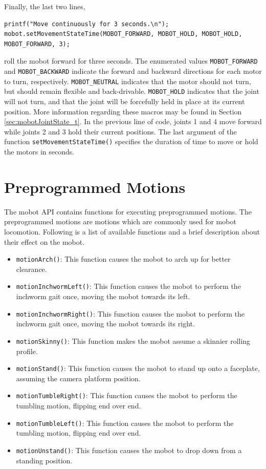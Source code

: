 \documentclass{article}
\begin{document}
Finally, the last two lines,
\begin{verbatim}
printf("Move continuously for 3 seconds.\n");
mobot.setMovementStateTime(MOBOT_FORWARD, MOBOT_HOLD, MOBOT_HOLD, MOBOT_FORWARD, 3);
\end{verbatim}
roll the mobot forward for three seconds.
The enumerated values \texttt{MOBOT\_FORWARD} and \texttt{MOBOT\_BACKWARD}
indicate the forward and backward directions for each motor to turn, respectively. 
\texttt{MOBOT\_NEUTRAL} indicates that the motor should not turn, but
should remain flexible and back-drivable. \texttt{MOBOT\_HOLD}
indicates that the joint will not turn, and that the joint will be 
forcefully held in place at its current position. More information regarding these
macros may be found in Section \ref{sec:mobotJointState_t}. In the previous
line of code, joints 1 and 4 
move forward while joints 2 and 3 hold their current positions. The
last argument  of the function \texttt{setMovementStateTime()} specifies the
duration of time to move or hold the motors in seconds.


\section{\label{sec:preprogrammed_motions}Preprogrammed Motions}
The mobot API contains functions for executing preprogrammed motions. The 
preprogrammed motions are motions which are commonly used for mobot locomotion.
Following is a list of available functions and a brief description about
their effect on the mobot.
\begin{itemize}
\item \texttt{motionArch()}: This function causes the mobot to arch up for better 
clearance.
\item \texttt{motionInchwormLeft()}: This function causes the mobot to perform
  the inchworm gait once, moving the mobot towards its left.
\item \texttt{motionInchwormRight()}: This function causes the mobot to perform
  the inchworm gait once, moving the mobot towards its right.
\item \texttt{motionSkinny()}: This function makes the mobot assume a skinnier
rolling profile.
\item \texttt{motionStand()}: This function causes the mobot to stand up onto a 
  faceplate, assuming the camera platform position.
\item \texttt{motionTumbleRight()}: This function causes the mobot to perform the
tumbling motion, flipping end over end.
\item \texttt{motionTumbleLeft()}: This function causes the mobot to perform the
tumbling motion, flipping end over end.
\item \texttt{motionUnstand()}: This function causes the mobot to drop down from a standing position.
\end{itemize}
\end{document}
